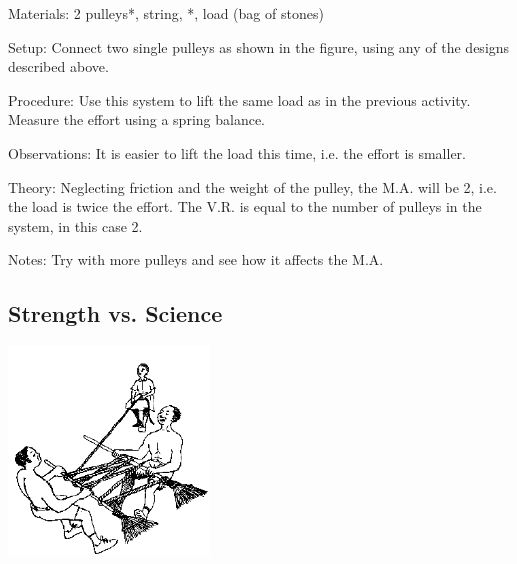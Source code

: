 \begin{multicols}{2}
\begin{description*}
\item[Materials:]{2 pulleys*, string, *, load (bag of stones)}
\item[Setup:]{Connect two single pulleys as shown in the figure, using any of the designs described above.}
\item[Procedure:]{Use this system to lift the same load as in the previous activity. Measure the effort using a spring balance.}
\item[Observations:]{It is easier to lift the load this time, i.e. the effort is smaller.}
\item[Theory:]{Neglecting friction and the weight of the pulley, the M.A. will be 2, i.e. the load is twice the effort. The V.R. is equal to the number of pulleys in the system, in this case 2.}
\item[Notes:]{Try with more pulleys and see how it affects the M.A.}
\end{description*}

\subsection{Strength vs. Science}

\begin{center}
\includegraphics[width=0.4\textwidth]{./img/source/pulley-strength.png}
\end{center}


\end{multicols}
